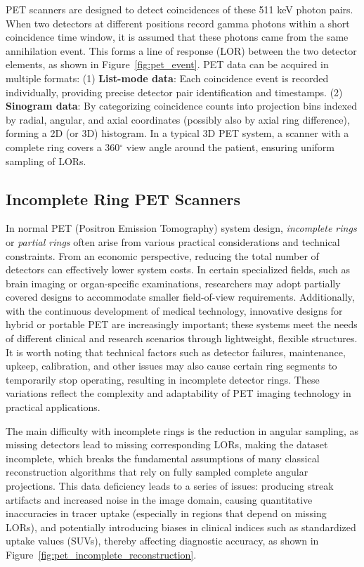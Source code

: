 \documentclass[
reprint,
superscriptaddress,
nofootinbib,
amsmath,amssymb,
aps,
prd,
]{revtex4-2}
\begin{document}
PET scanners are designed to detect coincidences of these 511 keV photon pairs. When two detectors at different positions record gamma photons within a short coincidence time window, it is assumed that these photons came from the same annihilation event. This forms a line of response (LOR) between the two detector elements, as shown in Figure~\ref{fig:pet_event}.
PET data can be acquired in multiple formats:
(1) \textbf{List-mode data}: Each coincidence event is recorded individually, providing precise detector pair identification and timestamps.
(2) \textbf{Sinogram data}: By categorizing coincidence counts into projection bins indexed by radial, angular, and axial coordinates (possibly also by axial ring difference), forming a 2D (or 3D) histogram.
In a typical 3D PET system, a scanner with a complete ring covers a 360$^\circ$ view angle around the patient, ensuring uniform sampling of LORs.

\subsection{Incomplete Ring PET Scanners}

In normal PET (Positron Emission Tomography) system design, \emph{incomplete rings} or \emph{partial rings} often arise from various practical considerations and technical constraints. From an economic perspective, reducing the total number of detectors can effectively lower system costs. In certain specialized fields, such as brain imaging or organ-specific examinations, researchers may adopt partially covered designs to accommodate smaller field-of-view requirements. Additionally, with the continuous development of medical technology, innovative designs for hybrid or portable PET are increasingly important; these systems meet the needs of different clinical and research scenarios through lightweight, flexible structures. It is worth noting that technical factors such as detector failures, maintenance, upkeep, calibration, and other issues may also cause certain ring segments to temporarily stop operating, resulting in incomplete detector rings. These variations reflect the complexity and adaptability of PET imaging technology in practical applications.


The main difficulty with incomplete rings is the reduction in angular sampling, as missing detectors lead to missing corresponding LORs, making the dataset incomplete, which breaks the fundamental assumptions of many classical reconstruction algorithms that rely on fully sampled complete angular projections. This data deficiency leads to a series of issues: producing streak artifacts and increased noise in the image domain, causing quantitative inaccuracies in tracer uptake (especially in regions that depend on missing LORs), and potentially introducing biases in clinical indices such as standardized uptake values (SUVs), thereby affecting diagnostic accuracy, as shown in Figure~\ref{fig:pet_incomplete_reconstruction}.
\end{document}
